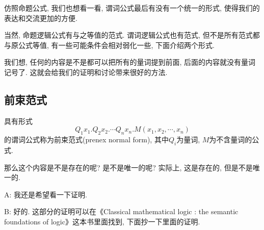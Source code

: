 仿照命题公式, 我们也想看一看, 谓词公式最后有没有一个统一的形式, 使得我们的表达和交流更加的方便. 


当然, 命题逻辑公式有与之等值的范式. 谓词逻辑公式也有范式, 但不是所有范式都与原公式等值, 有一些可能条件会相对弱化一些, 下面介绍两个形式. 

我们想, 任何的内容是不是都可以把所有的量词提到前面, 后面的内容就没有量词记号了. 这就会给我们的证明和讨论带来很好的方法. 


\subsection*{前束范式}

\begin{definition}[前束范式]
	具有形式$$Q_1x_1. Q_2x_2. \cdots Q_nx_n. M(x_1,x_2,\cdots,x_n)$$的谓词公式称为前束范式(prenex normal form), 其中$Q_i$为量词, $M$为不含量词的公式.
\end{definition}

那么这个内容是不是存在的呢? 是不是唯一的呢? 实际上, 这是存在的, 但是不是唯一的. 

\begin{dialogue}
	A: 我还是希望看一下证明.
	
	B: 好的. 这部分的证明可以在《Classical mathematical logic : the semantic foundations of logic》这本书里面找到, 下面抄一下里面的证明. 
\end{dialogue}

